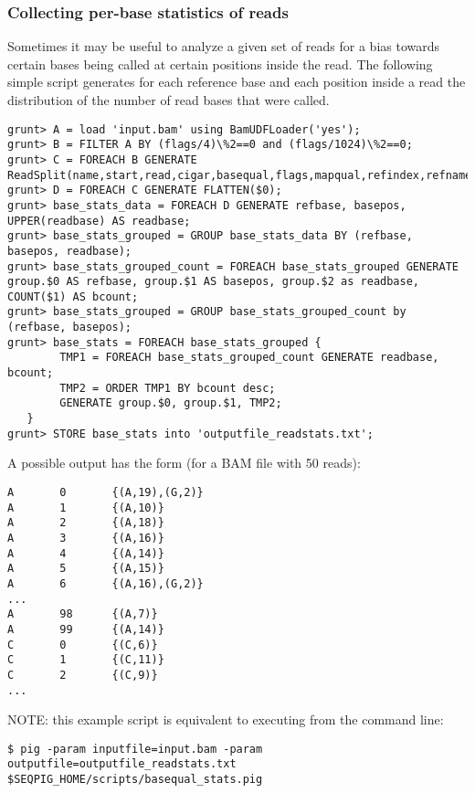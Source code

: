 \subsubsection{Collecting per-base statistics of reads}
Sometimes it may be useful to analyze a given set of reads for a bias
towards certain bases being called at certain positions inside the
read. The following simple script generates for each reference base and
each position inside a read the distribution of the number of read bases
that were called.
\begin{lstlisting}
grunt> A = load 'input.bam' using BamUDFLoader('yes');
grunt> B = FILTER A BY (flags/4)\%2==0 and (flags/1024)\%2==0;
grunt> C = FOREACH B GENERATE ReadSplit(name,start,read,cigar,basequal,flags,mapqual,refindex,refname,attributes#'MD');
grunt> D = FOREACH C GENERATE FLATTEN($0);
grunt> base_stats_data = FOREACH D GENERATE refbase, basepos, UPPER(readbase) AS readbase;
grunt> base_stats_grouped = GROUP base_stats_data BY (refbase, basepos, readbase);
grunt> base_stats_grouped_count = FOREACH base_stats_grouped GENERATE group.$0 AS refbase, group.$1 AS basepos, group.$2 as readbase, COUNT($1) AS bcount;
grunt> base_stats_grouped = GROUP base_stats_grouped_count by (refbase, basepos);
grunt> base_stats = FOREACH base_stats_grouped {
        TMP1 = FOREACH base_stats_grouped_count GENERATE readbase, bcount;
        TMP2 = ORDER TMP1 BY bcount desc;
        GENERATE group.$0, group.$1, TMP2;
   }
grunt> STORE base_stats into 'outputfile_readstats.txt';
\end{lstlisting}
A possible output has the form (for a BAM file with 50 reads):
\begin{lstlisting}
A       0       {(A,19),(G,2)}
A       1       {(A,10)}
A       2       {(A,18)}
A       3       {(A,16)}
A       4       {(A,14)}
A       5       {(A,15)}
A       6       {(A,16),(G,2)}
...
A       98      {(A,7)}
A       99      {(A,14)}
C       0       {(C,6)}
C       1       {(C,11)}
C       2       {(C,9)}
...
\end{lstlisting}
NOTE: this example script is equivalent to executing from the command line:
\begin{lstlisting}
$ pig -param inputfile=input.bam -param outputfile=outputfile_readstats.txt $SEQPIG_HOME/scripts/basequal_stats.pig
\end{lstlisting}

